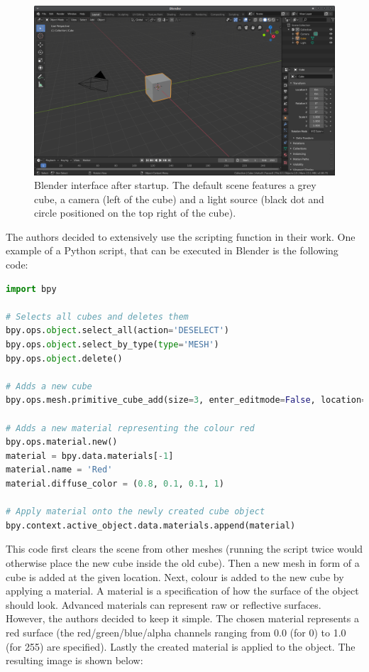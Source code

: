 \begin{figure}[h!]
	\centering
	\includegraphics[width=6.5in]{img/methodology_generatingData_blender_startscreen.png}
	\caption{Blender interface after startup. The default scene features a grey cube, a camera (left of the cube) and a light source (black dot and circle positioned on the top right of the cube).}
	\label{pic:methodology_generatingData_blender_startscreen}
\end{figure}

The authors decided to extensively use the scripting function in their work. One example of a Python script, that can be executed in Blender is the following code:

\newpage

\begin{lstlisting}[language=python]
import bpy

# Selects all cubes and deletes them
bpy.ops.object.select_all(action='DESELECT')
bpy.ops.object.select_by_type(type='MESH')
bpy.ops.object.delete()

# Adds a new cube
bpy.ops.mesh.primitive_cube_add(size=3, enter_editmode=False, location=(4, 2, 0))

# Adds a new material representing the colour red
bpy.ops.material.new()
material = bpy.data.materials[-1]
material.name = 'Red'
material.diffuse_color = (0.8, 0.1, 0.1, 1)

# Apply material onto the newly created cube object
bpy.context.active_object.data.materials.append(material)
\end{lstlisting}

This code first clears the scene from other meshes (running the script twice would otherwise place the new cube inside the old cube). Then a new mesh in form of a cube is added at the given location. Next, colour is added to the new cube by applying a material. A material is a specification of how the surface of the object should look. Advanced materials can represent raw or reflective surfaces. However, the authors decided to keep it simple. The chosen material represents a red surface (the red/green/blue/alpha channels ranging from 0.0 (for 0) to 1.0 (for 255) are specified). Lastly the created material is applied to the object. The resulting image is shown below:

